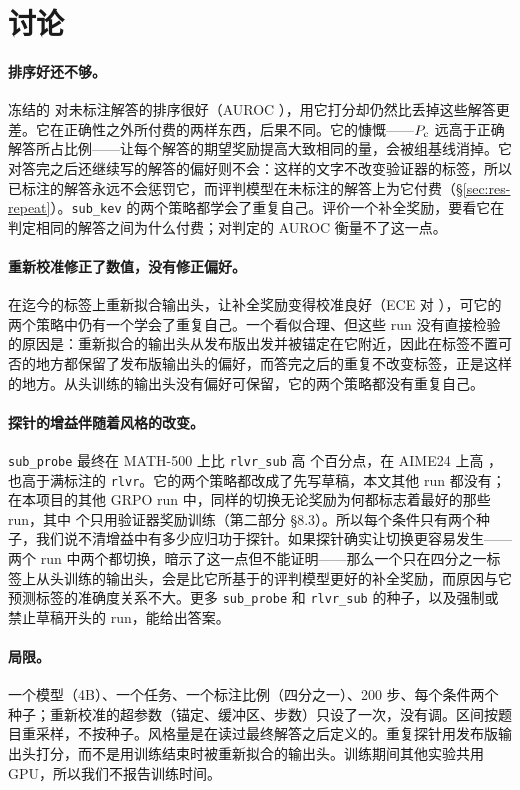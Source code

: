 
\section{讨论}\label{sec:discussion}

\paragraph{排序好还不够。} 冻结的 \kev{} 对未标注解答的排序很好（AUROC ），用它打分却仍然比丢掉这些解答更差。它在正确性之外所付费的两样东西，后果不同。它的慷慨——$P_{\mathrm{c}}$ 远高于正确解答所占比例——让每个解答的期望奖励提高大致相同的量，会被组基线消掉。它对答完之后还继续写的解答的偏好则不会：这样的文字不改变验证器的标签，所以已标注的解答永远不会惩罚它，而评判模型在未标注的解答上为它付费（\S\ref{sec:res-repeat}）。\texttt{sub\_kev} 的两个策略都学会了重复自己。评价一个补全奖励，要看它在判定相同的解答之间为什么付费；对判定的 AUROC 衡量不了这一点。

\paragraph{重新校准修正了数值，没有修正偏好。} 在迄今的标签上重新拟合输出头，让补全奖励变得校准良好（ECE  对 ），可它的两个策略中仍有一个学会了重复自己。一个看似合理、但这些 run 没有直接检验的原因是：重新拟合的输出头从发布版出发并被锚定在它附近，因此在标签不置可否的地方都保留了发布版输出头的偏好，而答完之后的重复不改变标签，正是这样的地方。从头训练的输出头没有偏好可保留，它的两个策略都没有重复自己。

\paragraph{探针的增益伴随着风格的改变。} \texttt{sub\_probe} 最终在 MATH-500 上比 \texttt{rlvr\_sub} 高  个百分点，在 AIME24 上高 ，也高于满标注的 \texttt{rlvr}。它的两个策略都改成了先写草稿，本文其他 run 都没有；在本项目的其他 GRPO run 中，同样的切换无论奖励为何都标志着最好的那些 run，其中  个只用验证器奖励训练（第二部分 \S8.3）。所以每个条件只有两个种子，我们说不清增益中有多少应归功于探针。如果探针确实让切换更容易发生——两个 run 中两个都切换，暗示了这一点但不能证明——那么一个只在四分之一标签上从头训练的输出头，会是比它所基于的评判模型更好的补全奖励，而原因与它预测标签的准确度关系不大。更多 \texttt{sub\_probe} 和 \texttt{rlvr\_sub} 的种子，以及强制或禁止草稿开头的 run，能给出答案。

\paragraph{局限。} 一个模型（4B）、一个任务、一个标注比例（四分之一）、200 步、每个条件两个种子；重新校准的超参数（锚定、缓冲区、步数）只设了一次，没有调。区间按题目重采样，不按种子。风格量是在读过最终解答之后定义的。重复探针用发布版输出头打分，而不是用训练结束时被重新拟合的输出头。训练期间其他实验共用 GPU，所以我们不报告训练时间。
